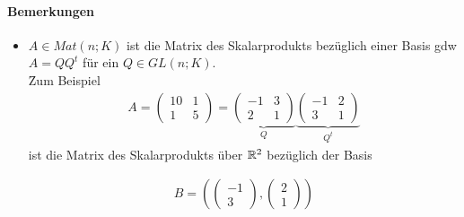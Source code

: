 \paragraph{Bemerkungen}
\begin{itemize}
\item $A \in Mat(n; K)$ ist die Matrix des Skalarprodukts bezüglich einer Basis gdw $A = QQ^t$ für ein $Q \in GL(n; K)$. \\
\f{Zum Beispiel}
\begin{align}
A = \begin{pmatrix} 10 & 1 \\ 1 & 5 \end{pmatrix} = \underbrace{\begin{pmatrix} -1 & 3 \\ 2 & 1 \end{pmatrix}}_{Q} \underbrace{\begin{pmatrix} -1 & 2 \\ 3 & 1 \end{pmatrix}}_{Q^t}
\end{align}
ist die Matrix des Skalarprodukts über $\mathbb{R}^2$ bezüglich der Basis

\begin{align}
B = \left( \begin{pmatrix} -1 \\ 3 \end{pmatrix}, \begin{pmatrix} 2 \\ 1 \end{pmatrix} \right)
\end{align}


\end{itemize}
